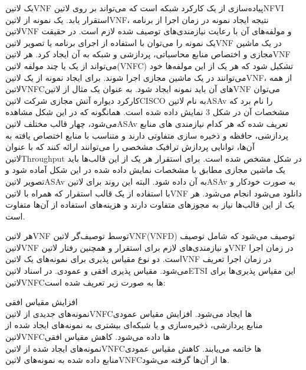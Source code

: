 یک ‌لاتین{VNF} پیاده‌سازی از یک کارکرد شبکه است که می‌تواند بر روی ‌لاتین{NFVI} استقرار یابد.
یک نمونه از ‌لاتین{VNF}، نتیجه ایجاد نمونه در زمان اجرا از برنامه ‌لاتین{VNF} و مولفه‌های آن با رعایت نیازمندی‌های توصیف شده لازم است.
در حقیقت یک نمونه را می‌توان با استفاده از اجرای برنامه یا تصویر ‌لاتین{VNF} در یک ماشین مجازی و اختصاص منابع محاسباتی، پردازشی و شبکه به آن ایجاد کرد.
هر ‌لاتین{VNF} می‌تواند از یک یا چند مولفه ‌لاتین{(VNFC)} تشکیل شود که هر یک از این مولفه‌ها خود می‌توانند در یک ماشین مجازی اجرا شوند.
برای ایجاد نمونه از یک ‌لاتین{VNF}، از همه ‌لاتین{VNFC}های آن باید نمونه ایجاد شود.
به عنوان یک مثال از ‌لاتین{VNF} می‌توان کارکرد دیواره آتش مجازی شرکت ‌لاتین{CISCO} به نام ‌لاتین{ASAv} را نام برد که مشخصات آن در شکل 3 نمایش داده شده است.
همانگونه که در این شکل مشاهده می‌شود، چهار قالب مختلف ‌لاتین{ASAv} تعریف شده که هر کدام نیازمندی های منابع پردازشی، حافظه و ذخیره سازی متفاوتی دارند و متناسب با منابع اختصاص یافته به آن‌ها،
توانایی پردازش ترافیک مشخصی را می‌توانند ارائه کنند که با عنوان ‌لاتین{Throughput} در شکل مشخص شده است. برای استقرار هر یک از این قالب‌ها باید یک ماشین مجازی مطابق با
مشخصات نمایش داده شده در این شکل آماده شود و تصویر ‌لاتین{ASAv} به آن داده شود.
البته این روند برای ‌لاتین{ASAv} به صورت خودکار و با استفاده از یک قالب استقرار که همراه با ‌لاتین{VNF} دانلود می‌شود انجام می‌شود.
هر یک از این قالب‌ها نیاز به مجوزهای متفاوت دارند و هزینه‌های استفاده از آن‌ها متفاوت است.

هر ‌لاتین{VNF} توسط توصیف‌گر ‌لاتین{VNF(VNFD)} توصیف می‌شود که شامل توصیف ‌لاتین{VNF} و
نیازمندی‌های لازم برای استقرار و همچنین رفتار ‌لاتین{VNF} در زمان اجرا است.
دو نوع مقیاس پذیری برای نمونه‌های یک ‌لاتین{VNF} در زمان اجرا تعریف می‌شود. مقیاس پذیری افقی و عمودی. در اسناد ‌لاتین{ETSI} این مقیاس پذیری‌ها برای ‌لاتین{VNFC}ها به صورت زیر تعریف شده است:


 افزایش مقیاس افقی\\ نمونه‌های جدیدی از ‌لاتین{VNFC}ها ایجاد می‌شود.
 افزایش مقیاس عمودی\\ منابع پردازشی، ذخیره‌سازی و یا شبکه‌ای بیشتری به نمونه‌های ایجاد شده از ‌لاتین{VNFC}ها داده می‌شود.
 کاهش مقیاس افقی\\ نمونه‌های ایجاد شده از ‌لاتین{VNFC}ها خاتمه می‌یابند.
 کاهش مقیاس عمودی\\ منابع داده شده به نمونه‌های ‌لاتین{VNFC}ها از آن‌ها گرفته می‌شود.

